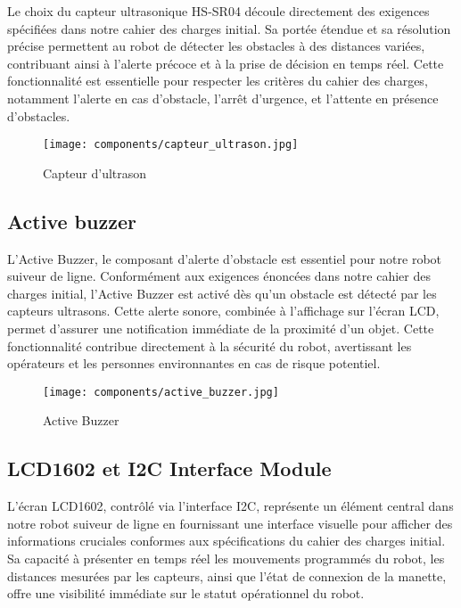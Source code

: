 Le choix du capteur ultrasonique HS-SR04 découle directement des exigences spécifiées dans notre cahier des charges initial. Sa portée étendue et sa résolution précise permettent au robot de détecter les obstacles à des distances variées, contribuant ainsi à l'alerte précoce et à la prise de décision en temps réel. Cette fonctionnalité est essentielle pour respecter les critères du cahier des charges, notamment l'alerte en cas d'obstacle, l'arrêt d'urgence, et l'attente en présence d'obstacles.

\begin{figure}[h]
    \centering
    \texttt{[image: components/capteur\_ultrason.jpg]}
    \caption{Capteur d'ultrason}
    \label{fig:HS-SR04}
\end{figure}

\subsection{Active buzzer}
L'Active Buzzer, le composant d'alerte d'obstacle est essentiel pour notre robot suiveur de ligne. Conformément aux exigences énoncées dans notre cahier des charges initial, l'Active Buzzer est activé dès qu'un obstacle est détecté par les capteurs ultrasons. Cette alerte sonore, combinée à l'affichage sur l'écran LCD, permet d'assurer une notification immédiate de la proximité d'un objet. Cette fonctionnalité contribue directement à la sécurité du robot, avertissant les opérateurs et les personnes environnantes en cas de risque potentiel.

\begin{figure}[h]
    \centering
    \texttt{[image: components/active\_buzzer.jpg]}
    \caption{Active Buzzer}
    \label{fig:Active Buzzer}
\end{figure}

\subsection{LCD1602 et I2C Interface Module}
L'écran LCD1602, contrôlé via l'interface I2C, représente un élément central dans notre robot suiveur de ligne en fournissant une interface visuelle pour afficher des informations cruciales conformes aux spécifications du cahier des charges initial. Sa capacité à présenter en temps réel les mouvements programmés du robot, les distances mesurées par les capteurs, ainsi que l'état de connexion de la manette, offre une visibilité immédiate sur le statut opérationnel du robot.

